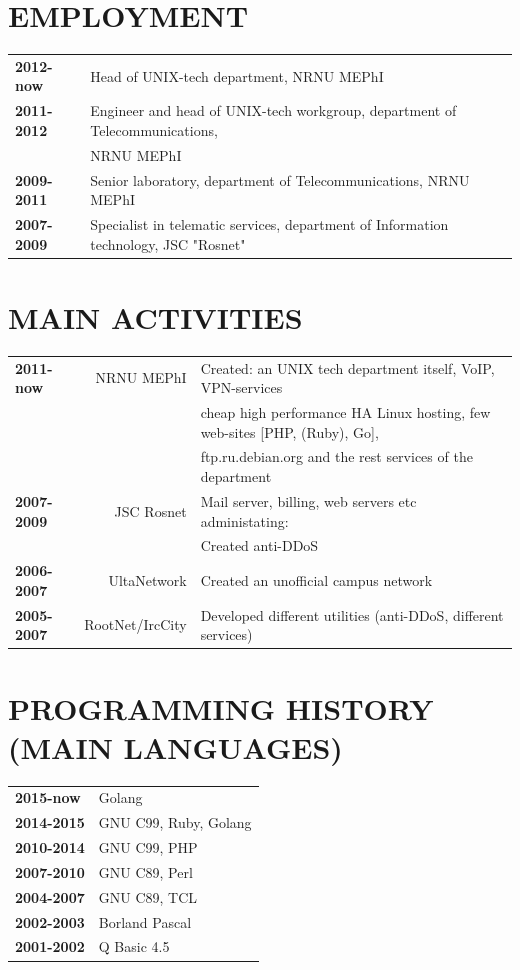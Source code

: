 \begin{resume}
\section{EMPLOYMENT}
\vspace{0.1in} 
\begin{tabular}{ll}
    {\bf 2012-now } & Head of UNIX-tech department, NRNU MEPhI\\
    {\bf 2011-2012} & Engineer and head of UNIX-tech workgroup, department of Telecommunications,\\
                    & NRNU MEPhI\\
    {\bf 2009-2011} & Senior laboratory, department of Telecommunications, NRNU MEPhI\\
    {\bf 2007-2009} & Specialist in telematic services, department of Information technology, JSC "Rosnet"\\
\end{tabular}

\section{MAIN ACTIVITIES}
\vspace{0.1in} 
\begin{tabular}{lrl}
    {\bf 2011-now } & NRNU MEPhI      & Created: an UNIX tech department itself, VoIP, VPN-services\\
                    &                 & cheap high performance HA Linux hosting, few web-sites [PHP, (Ruby), Go],\\
                    &                 & ftp.ru.debian.org and the rest services of the department\\
    {\bf 2007-2009} & JSC Rosnet      & Mail server, billing, web servers etc administating:\\
                    &                 & Created anti-DDoS\\
    {\bf 2006-2007} & UltaNetwork     & Created an unofficial campus network\\
    {\bf 2005-2007} & RootNet/IrcCity & Developed different utilities (anti-DDoS, different services)\\
\end{tabular}

\section{PROGRAMMING HISTORY (MAIN LANGUAGES)}
\vspace{0.1in} 
\begin{tabular}{ll}
{\bf 2015-now}  & Golang\\
{\bf 2014-2015} & GNU C99, Ruby, Golang\\
{\bf 2010-2014} & GNU C99, PHP\\
{\bf 2007-2010} & GNU C89, Perl\\
{\bf 2004-2007} & GNU C89, TCL\\
{\bf 2002-2003} & Borland Pascal\\
{\bf 2001-2002} & Q Basic 4.5\\
\end{tabular}


\end{resume}
